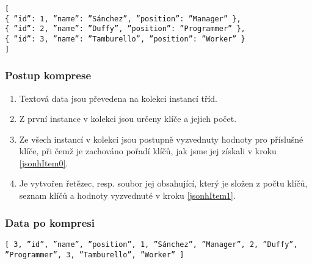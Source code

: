 \texttt{[\\
\hspace*{5mm}\{ \textquotedblright id\textquotedblright : 1, \textquotedblright name\textquotedblright : \textquotedblright Sánchez\textquotedblright, \textquotedblright position\textquotedblright : \textquotedblright Manager\textquotedblright\ \},\\
\hspace*{5mm}\{ \textquotedblright id\textquotedblright : 2, \textquotedblright name\textquotedblright : \textquotedblright Duffy\textquotedblright, \textquotedblright position\textquotedblright : \textquotedblright Programmer\textquotedblright\ \},\\
\hspace*{5mm}\{ \textquotedblright id\textquotedblright : 3, \textquotedblright name\textquotedblright : \textquotedblright Tamburello\textquotedblright, \textquotedblright position\textquotedblright : \textquotedblright Worker\textquotedblright\ \}\\
]}

\subsubsection{Postup komprese}
\begin{enumerate}
\item Textová data jsou převedena na kolekci instancí tříd.
\item \label{jsonhItem0} Z první instance v kolekci jsou určeny klíče a jejich počet.
\item \label{jsonhItem1} Ze všech instancí v kolekci jsou postupně vyzvednuty hodnoty pro příslušné klíče, při čemž je zachováno pořadí klíčů, jak jsme jej získali v kroku \ref{jsonhItem0}.
\item Je vytvořen řetězec, resp. soubor jej obsahující, který je složen z počtu klíčů, seznam klíčů a hodnoty vyzvednuté v kroku \ref{jsonhItem1}.
\end{enumerate}

\subsubsection{Data po kompresi}
\texttt{[ 3, \textquotedblright id\textquotedblright, \textquotedblright name\textquotedblright, \textquotedblright position\textquotedblright, 1, \textquotedblright Sánchez\textquotedblright, \textquotedblright Manager\textquotedblright, 2, \textquotedblright Duffy\textquotedblright,\\
\hspace*{5mm}\textquotedblright Programmer\textquotedblright, 3, \textquotedblright Tamburello\textquotedblright, \textquotedblright Worker\textquotedblright\ ]}

